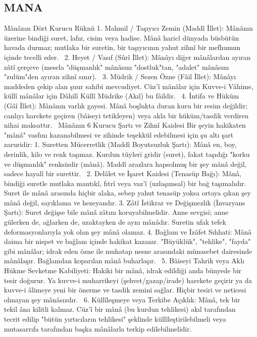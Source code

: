 \documentclass[11pt,a4paper]{article}
\begin{document}
\subsection{MANA}




Mânânın Dört Kurucu Rüknü
 1. Mahmil / Taşıyıcı Zemin (Maddî İllet): Mânânın üzerine bindiği suret, lafız, cisim veya hadise. Mânâ haricî dünyada büsbütün havada durmaz; mutlaka bir suretin, bir taşıyıcının yahut zihnî bir mefhumun içinde tecelli eder.  
 2. Heyet / Vasıf (Sûrî İllet): Mânâyı diğer mânâlardan ayıran zâtî çerçeve (mesela "düşmanlık" mânâsını "dostluk"tan, "adalet" mânâsını "zulüm"den ayıran zihnî sınır).  
 3. Müdrik / Sezen Özne (Fâil İllet): Mânâyı maddeden çekip alan şuur sahibi mevcudiyet. Cüz'î mânâlar için Kuvve-i Vâhime, küllî mânâlar için Dâhilî Küllî Müdrike (Akıl) bu fâildir.  
 4. İntifa ve Hüküm (Gâî İllet): Mânânın varlık gayesi. Mânâ boşlukta duran kuru bir resim değildir; canlıyı harekete geçiren (bâiseyi tetikleyen) veya akla bir hüküm/tasdik verdiren nihai maksattır.  
Mânânın 6 Kurucu Şartı ve Zihnî Kaidesi
Bir şeyin hakikaten "mânâ" vasfını kazanabilmesi ve zihinde teşekkül edebilmesi için şu altı şart zaruridir:
 1. Suretten Mücerretlik (Maddî Boyutsuzluk Şartı):
Mânâ en, boy, derinlik, kilo ve renk taşımaz. Kurdun tüyleri gridir (suret), fakat taşıdığı "korku ve düşmanlık" renksizdir (mânâ). Maddî arazlara hapsolmuş bir şey mânâ değil, sadece hayalî bir surettir.  
 2. Delâlet ve İşaret Kaidesi (Tenasüp Bağı):
Mânâ, bindiği suretle mutlaka mantıkî, fıtrî veya vaz'î (uzlaşımsal) bir bağ taşımalıdır. Suret ile mânâ arasında hiçbir alaka, sebep yahut tenasüp yoksa ortaya çıkan şey mânâ değil, sayıklama ve hezeyandır.
 3. Zâtî İstikrar ve Değişmezlik (İnvaryans Şartı):
Suret değişse bile mânâ zâtını koruyabilmelidir. Anne sevgisi; anne gülerken de, ağlarken de, uzaktayken de aynı mânâdır. Suretin ufak tefek deformasyonlarıyla yok olan şey mânâ olamaz.
 4. Bağlam ve İzâfet Sıhhati:
Mânâ daima bir nispet ve bağlam içinde hakikat kazanır. "Büyüklük", "tehlike", "fayda" gibi mânâlar; idrak eden özne ile muhatap nesne arasındaki münasebet dairesinde mânâlaşır. Bağlamdan koparılan mânâ buharlaşır.  
 5. Bâiseyi Tahrik veya Aklı Hükme Sevketme Kabiliyeti:
Hakiki bir mânâ, idrak edildiği anda bünyede bir tesir doğurur. Ya kuvve-i muharrikeyi (şehvet/gazap/irade) harekete geçirir ya da kuvve-i âlimeye yeni bir önerme ve tasdik zemini sağlar. Hiçbir tesiri ve neticesi olmayan şey mânâsızdır.  
 6. Küllîleşmeye veya Terkibe Açıklık:
Mânâ, tek bir tekil âna kilitli kalmaz. Cüz'î bir mânâ (bu kurdun tehlikesi) akıl tarafından tecrit edilip "bütün yırtıcıların tehlikesi" şeklinde küllîleştirilebilmeli veya mutasarrıfa tarafından başka mânâlarla terkip edilebilmelidir. 
\end{document}
